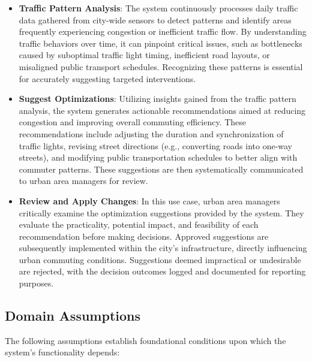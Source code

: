 \documentclass[a4paper,12pt]{article}
\begin{document}
\begin{itemize}
    \item \textbf{Traffic Pattern Analysis}:
The system continuously processes daily traffic data gathered from city-wide sensors to detect patterns and identify areas frequently experiencing congestion or inefficient traffic flow. By understanding traffic behaviors over time, it can pinpoint critical issues, such as bottlenecks caused by suboptimal traffic light timing, inefficient road layouts, or misaligned public transport schedules. Recognizing these patterns is essential for accurately suggesting targeted interventions.

\item \textbf{Suggest Optimizations}:
Utilizing insights gained from the traffic pattern analysis, the system generates actionable recommendations aimed at reducing congestion and improving overall commuting efficiency. These recommendations include adjusting the duration and synchronization of traffic lights, revising street directions (e.g., converting roads into one-way streets), and modifying public transportation schedules to better align with commuter patterns. These suggestions are then systematically communicated to urban area managers for review.

\item \textbf{Review and Apply Changes}:
In this use case, urban area managers critically examine the optimization suggestions provided by the system. They evaluate the practicality, potential impact, and feasibility of each recommendation before making decisions. Approved suggestions are subsequently implemented within the city’s infrastructure, directly influencing urban commuting conditions. Suggestions deemed impractical or undesirable are rejected, with the decision outcomes logged and documented for reporting purposes.
\end{itemize}

\subsection{Domain Assumptions}

The following assumptions establish foundational conditions upon which the system's functionality depends:
\end{document}
